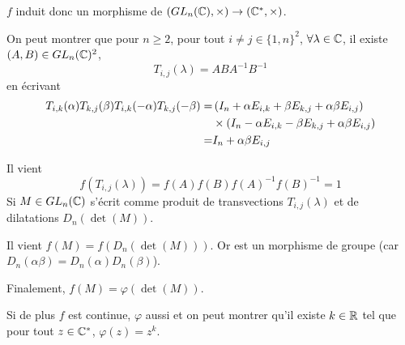 \begin{remark}
    $f$ induit donc un morphisme de $\left(GL_{n}(\mathbb{C}),\times\right)\to(\mathbb{C}^{*},\times)$.
\end{remark}

\begin{remark}
    On peut montrer que pour $n\geqslant 2$, pour tout $i\neq j\in\lbrace1,n\rbrace^{2}$, $\forall \lambda \in \mathbb{C}$, il existe $(A,B)\in GL_{n}(\mathbb{C})^{2}$,
    \begin{equation}
        T_{i,j}(\lambda)=ABA^{-1}B^{-1}
    \end{equation}
    en écrivant 
    \begin{align}
        T_{i,k}(\alpha)T_{k,j}(\beta)T_{i,k}(-\alpha)T_{k,j}(-\beta)
        =&\left(I_{n}+\alpha E_{i,k}+\beta E_{k,j}+\alpha \beta E_{i,j}\right)\notag\\
        ~~~~~~&\times \left(I_{n}-\alpha E_{i,k}-\beta E_{k,j}+\alpha\beta E_{i,j}\right)\\
        =&I_{n}+\alpha\beta E_{i,j}
    \end{align}

    Il vient 
    \begin{equation}
        f(T_{i,j}(\lambda))=f(A)f(B)f(A)^{-1}f(B)^{-1}=1
    \end{equation}
    Si $M\in GL_{n}(\mathbb{C})$ s'écrit comme produit de transvections $T_{i,j}(\lambda)$ et de dilatations $D_{n}(\det(M))$.

    Il vient $f(M)=f(D_{n}(\det(M)))$. Or 
    est un morphisme de groupe (car $D_{n}(\alpha\beta)=D_{n}(\alpha)D_{n}(\beta)$).

    Finalement, $f(M)=\varphi(\det(M))$.

    Si de plus $f$ est continue, $\varphi$ aussi et on peut montrer qu'il existe $k\in\mathbb{R}$ tel que pour tout $z\in\mathbb{C}^{*}$, $\varphi(z)=z^{k}$.
\end{remark}